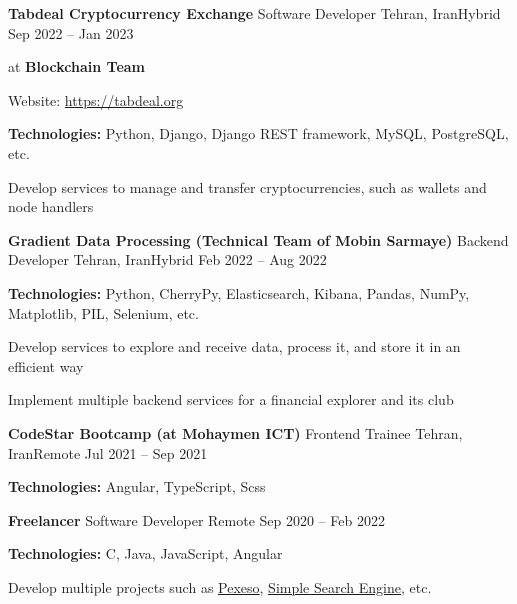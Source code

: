 \documentclass[]{awesome-cv}
\begin{document}
\begin{cventries}
	\cventry
	{\textbf{Tabdeal Cryptocurrency Exchange}}
	{Software Developer}
	{Tehran, Iran{\enskip\cdotp\enskip}Hybrid}
	{Sep 2022 – Jan 2023}
	{\begin{cvitems}
		\vspace{1mm}
		\item[] {\hspace{-9mm}} at \textbf{Blockchain Team}
		\vspace{1mm}
		\item[] {\hspace{-9mm} Website: \href{https://tabdeal.org}{\textcolor{awesome}{https://tabdeal.org}}}
		\vspace{1mm}
		\item {\textbf{Technologies:} Python, Django, Django REST framework, MySQL, PostgreSQL, etc.}
		\vspace{1mm}
		\item {Develop services to manage and transfer cryptocurrencies, such as wallets and node handlers}
	\end{cvitems}}
	\cventry
	{\textbf{Gradient Data Processing (Technical Team of Mobin Sarmaye)}}
	{Backend Developer}
	{Tehran, Iran{\enskip\cdotp\enskip}Hybrid}
	{Feb 2022 – Aug 2022}
	{\begin{cvitems}
		\vspace{1mm}
		\item {\textbf{Technologies:} Python, CherryPy, Elasticsearch, Kibana, Pandas, NumPy, Matplotlib, PIL, Selenium, etc.}
		\vspace{1mm}
		\item {Develop services to explore and receive data, process it, and store it in an efficient way}
		\vspace{1mm}
		\item {Implement multiple backend services for a financial explorer and its club}
	\end{cvitems}}
	\cventry
	{\textbf{CodeStar Bootcamp (at Mohaymen ICT)}}
	{Frontend Trainee}
	{Tehran, Iran{\enskip\cdotp\enskip}Remote}
	{Jul 2021 – Sep 2021}
	{\begin{cvitems}
		\vspace{1mm}
		\item {\textbf{Technologies:} Angular, TypeScript, Scss}
	\end{cvitems}}
	\cventry
	{\textbf{Freelancer}}
	{Software Developer}
	{Remote}
	{Sep 2020 – Feb 2022}
	{\begin{cvitems}
		\vspace{1mm}
		\item {\textbf{Technologies:} C, Java, JavaScript, Angular}
		\vspace{1mm}
		\item {Develop multiple projects such as \href{https://github.com/AshkanShakiba/Pexeso}{\textcolor{awesome}{Pexeso}}, \href{https://github.com/AshkanShakiba/Joojle}{\textcolor{awesome}{Simple Search Engine}}, etc.}
	\end{cvitems}}
\end{cventries}
\end{document}
